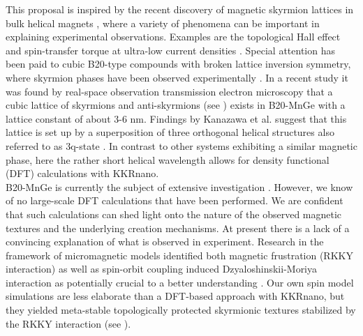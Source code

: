 \documentclass [a4paper, 12pt]{article}
\begin{document}
This proposal is inspired by the recent discovery of magnetic skyrmion lattices in bulk helical magnets
\cite{muhlbauer_skyrmion_2009,yu_real-space_2010,yu_near_2011,shibata_towards_2013},
where a variety of phenomena can be important in explaining experimental observations.
Examples are the topological Hall effect and spin-transfer torque at ultra-low current densities
\cite{kanazawa_large_2011}.
Special attention has been paid to cubic B20-type compounds with broken lattice inversion symmetry,
where skyrmion phases have been observed experimentally
\cite{nagaosa_topological_2013}.
In a recent study \cite{tanigaki_real-space_2015} 
it was found by real-space observation transmission electron microscopy 
that a cubic lattice of skyrmions and anti-skyrmions (see ) exists in B20-MnGe with
a lattice constant of about 3-6 nm. Findings by Kanazawa et al. suggest that this
lattice is set up by a superposition of three orthogonal helical
structures also referred to as 3q-state \cite{kanazawa_noncentrosymmetric_2017}.
In contrast to other systems exhibiting a similar magnetic phase,
here the rather short helical wavelength allows for density functional (DFT) calculations
with KKRnano. 
\\
B20-MnGe is currently the subject of extensive investigation
\cite{kanazawa_large_2011,kanazawa_possible_2012,grigoriev_chiral_2013,tanigaki_real-space_2015,
martin_magnetic_2016}.
However, we know of no large-scale DFT calculations that have been performed.
We are confident that such calculations can shed light onto the nature of
the observed magnetic textures and the underlying creation mechanisms.
At present there is a lack of a convincing explanation of what is observed in experiment. 
Research in the framework of micromagnetic models identified both magnetic frustration (RKKY interaction) 
as well as spin-orbit coupling induced Dzyaloshinskii-Moriya interaction as potentially
crucial to a better understanding \cite{altynbaev_hidden_2016,koretsune_control_2015}.
Our own spin model simulations are less elaborate than a DFT-based approach with KKRnano, but they
yielded meta-stable
topologically protected skyrmionic textures \cite{bornemann_investigation_2017} stabilized by the RKKY interaction
(see ).
\end{document}
